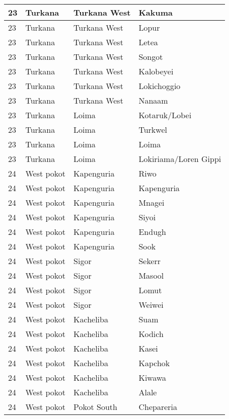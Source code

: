 \begin{table}[!ht]
\begin{tabular}{|l|l|l|l|}
        23 & Turkana & Turkana West & Kakuma \\ \hline
        23 & Turkana & Turkana West & Lopur \\ \hline
        23 & Turkana & Turkana West & Letea \\ \hline
        23 & Turkana & Turkana West & Songot \\ \hline
        23 & Turkana & Turkana West & Kalobeyei \\ \hline
        23 & Turkana & Turkana West & Lokichoggio \\ \hline
        23 & Turkana & Turkana West & Nanaam \\ \hline
        23 & Turkana & Loima & Kotaruk/Lobei \\ \hline
        23 & Turkana & Loima & Turkwel \\ \hline
        23 & Turkana & Loima & Loima \\ \hline
        23 & Turkana & Loima & Lokiriama/Loren Gippi \\ \hline
        24 & West pokot & Kapenguria & Riwo \\ \hline
        24 & West pokot & Kapenguria & Kapenguria \\ \hline
        24 & West pokot & Kapenguria & Mnagei \\ \hline
        24 & West pokot & Kapenguria & Siyoi \\ \hline
        24 & West pokot & Kapenguria & Endugh \\ \hline
        24 & West pokot & Kapenguria & Sook \\ \hline
        24 & West pokot & Sigor & Sekerr \\ \hline
        24 & West pokot & Sigor & Masool \\ \hline
        24 & West pokot & Sigor & Lomut \\ \hline
        24 & West pokot & Sigor & Weiwei \\ \hline
        24 & West pokot & Kacheliba & Suam \\ \hline
        24 & West pokot & Kacheliba & Kodich \\ \hline
        24 & West pokot & Kacheliba & Kasei \\ \hline
        24 & West pokot & Kacheliba & Kapchok \\ \hline
        24 & West pokot & Kacheliba & Kiwawa \\ \hline
        24 & West pokot & Kacheliba & Alale \\ \hline
        24 & West pokot & Pokot South & Chepareria \\ \hline

\end{tabular}
\end{table}
